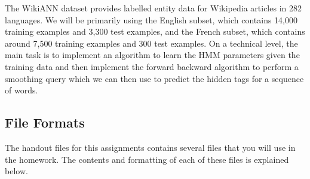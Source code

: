 \documentclass[11pt,addpoints,answers]{exam}
\begin{document}
The WikiANN dataset provides labelled entity data for Wikipedia articles in 282 languages. We will be primarily using the English subset, which contains 14,000 training examples and 3,300 test examples, and the French subset, which contains around 7,500 training examples and 300 test examples. On a technical level, the main task is to implement an algorithm to learn the HMM parameters given the training data and then implement the forward backward algorithm to perform a smoothing query which we can then use to predict the hidden tags for a sequence of words. 

\clearpage
\subsection{File Formats}\label{formats}
The handout files for this assignments contains several files that you will use in the homework. The contents and formatting of each of these files is explained below. 
\end{document}
